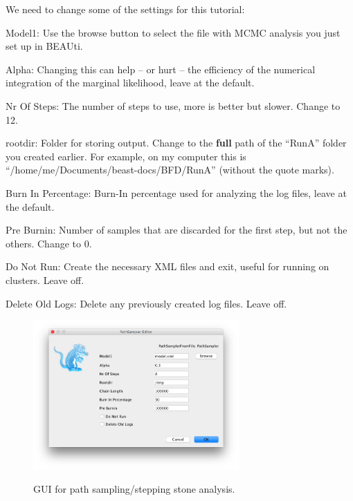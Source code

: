 {    	    

We need to change some of the settings for this tutorial:

    \begin{compactdesc}
       \item[Model1:]{Use the browse button to select the file with MCMC analysis you just set up in BEAUti.}
       \item[Alpha:]{Changing this can help -- or hurt -- the efficiency of the numerical integration of the marginal likelihood, leave at the default.}
       \item[Nr Of Steps:]{The number of steps to use, more is better but slower. Change to 12.}
       \item[rootdir:]{Folder for storing output. Change to the \textbf{full} path of the ``RunA'' folder you created earlier. For example, on my computer this is ``/home/me/Documents/beast-docs/BFD/RunA'' (without the quote marks).}
       \item[Burn In Percentage:]{Burn-In percentage used for analyzing the log files, leave at the default.}
       \item[Pre Burnin:]{Number of samples that are discarded for the first step, but not the others. Change to 0.}
       \item[Do Not Run:]{Create the necessary XML files and exit, useful for running on clusters. Leave off.}
       \item[Delete Old Logs:]{Delete any previously created log files. Leave off.}
    \end{compactdesc}

    \begin{figure}[htbp]
        \centering
        {\includegraphics[width=0.7\textwidth]{screenshots/pathsampler}}
        \caption{GUI for path sampling/stepping stone analysis.}
        \label{fig:pathsampler}
    \end{figure}

}

